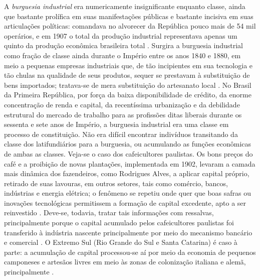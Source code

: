 A \textit{burguesia industrial} era numericamente insignificante enquanto classe, ainda que bastante prolífica em suas manifestações públicas e bastante incisiva em suas articulações políticas: comandava no alvorecer da República pouco mais de 54 mil operários, e em 1907 o total da produção industrial representava apenas um quinto da produção econômica brasileira total \cite[pp.~24-25]{gorender_burguesia_1990}. Surgira a burguesia industrial como fração de classe ainda durante o Império entre os anos 1840 e 1880, em meio a pequenas empresas industriais que, de tão incipientes em sua tecnologia e tão chulas na qualidade de seus produtos, sequer se prestavam à substituição de bens importados; tratava-se de mera substituição do artesanato local \cite[pp.~13-14]{gorender_burguesia_1990}. No Brasil da Primeira República, por força da baixa disponibilidade de crédito, da enorme concentração de renda e capital, da recentíssima urbanização e da debilidade estrutural do mercado de trabalho para as profissões ditas liberais durante os sessenta e sete anos de Império, a burguesia industrial era uma classe em processo de constituição. Não era difícil encontrar indivíduos transitando da classe dos latifundiários para a burguesia, ou acumulando as funções econômicas de ambas as classes. Veja-se o caso dos cafeicultores paulistas. Os bons preços do café e a proibição de novas plantações, implementada em 1902, levaram a camada mais dinâmica dos fazendeiros, como Rodrigues Alves, a aplicar capital próprio, retirado de suas lavouras, em outros setores, tais como comércio, bancos, indústrias e energia elétrica; o fenômeno se repetiu onde quer que boas safras ou inovações tecnológicas permitissem a formação de capital excedente, apto a ser reinvestido \cite[p.~147]{CARONE1970inst}. Deve-se, todavia, tratar tais informações com ressalvas, principalmente porque o capital acumulado pelos cafeicultores paulistas foi transferido à indústria nascente principalmente por meio do mecanismo bancário e comercial \cite[p.~38]{gorender_burguesia_1990}. O Extremo Sul (Rio Grande do Sul e Santa Catarina) é caso à parte: a acumulação de capital processou-se aí por meio da economia de pequenos camponeses e artesãos livres em meio às zonas de colonização italiana e alemã, principalmente \cite[p.~31]{gorender_burguesia_1990}.

